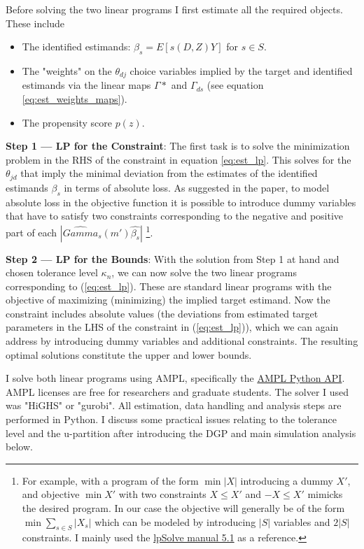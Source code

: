 \documentclass{article}
\begin{document}
Before solving the two linear programs I first estimate all the required objects. These include
\begin{itemize}
    \item The identified estimands: $\beta_s = E[s(D,Z)Y]$ for $s\in S$.
    \item The "weights" on the $\theta_{dj}$ choice variables implied by the target and identified estimands via the linear maps $\Gamma*$ and $\Gamma_{ds}$ (see equation \ref{eq:est_weights_maps}).
    \item The propensity score $p(z)$.
\end{itemize}

\textbf{Step 1 --- LP for the Constraint}: The first task is to solve the minimization problem in the RHS of the constraint in equation \ref{eq:est_lp}.
This solves for the $\theta_{jd}$ that imply the minimal deviation from the estimates of the identified estimands $\beta_s$ in terms of absolute loss.
As suggested in the paper, to model absolute loss in the objective function it is possible to introduce dummy variables that have to satisfy two constraints corresponding to the negative and positive part of each $|\hat{Gamma}_s(m')\hat{\beta_s}|$
\footnote{For example, with a program of the form $\min |X|$ introducing a dummy $X'$, and objective $\min X'$ with two constraints $X\leq X'$ and $-X\leq X'$ mimicks the desired program.
In our case the objective will generally be of the form $\min\sum_{s\in S}|X_s|$ which can be modeled by introducing $|S|$ variables and $2|S|$ constraints. I mainly used the \href{https://lpsolve.sourceforge.net/5.1/absolute.htm}{lpSolve manual 5.1} as a reference.}.   

\textbf{Step 2 --- LP for the Bounds}: With the solution from Step 1 at hand and chosen tolerance level $\kappa_n$, we can now solve the two linear programs corresponding to (\ref{eq:est_lp}).
These are standard linear programs with the objective of maximizing (minimizing) the implied target estimand. Now the constraint includes absolute values (the deviations from estimated target parameters in the LHS of the constraint in (\ref{eq:est_lp})), which we can again address by introducing dummy variables and additional constraints.
The resulting optimal solutions constitute the upper and lower bounds.

I solve both linear programs using AMPL, specifically the \href{https://amplpy.readthedocs.io/en/latest/}{AMPL Python API}. AMPL licenses are free for researchers and graduate students. 
The solver I used was "HiGHS" or "gurobi". All estimation, data handling and analysis steps are performed in Python.
I discuss some practical issues relating to the tolerance level and the u-partition after introducing the DGP and main simulation analysis below.
\end{document}

